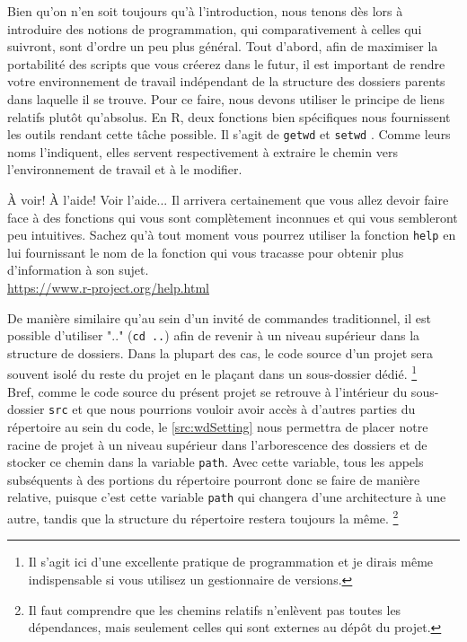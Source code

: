 Bien qu'on n'en soit toujours qu'à l'introduction, nous tenons dès lors à introduire des notions de programmation, qui comparativement à celles qui suivront, sont d'ordre un peu plus général. Tout d'abord, afin de maximiser la portabilité des scripts que vous créerez dans le futur, il est important de rendre votre environnement de travail indépendant de la structure des dossiers parents dans laquelle il se trouve. Pour ce faire, nous devons utiliser le principe de liens relatifs plutôt qu'absolus. En R, deux fonctions bien spécifiques nous fournissent les outils rendant cette tâche possible. Il s'agit de \texttt{getwd} et \texttt{setwd} \cite{Rfunction:setwd}. Comme leurs noms l'indiquent, elles servent respectivement à extraire le chemin vers l'environnement de travail et à le modifier. \\

\begin{moreInfo}{À voir! À l'aide! Voir l'aide...}
	Il arrivera certainement que vous allez devoir faire face à des fonctions qui vous sont complètement inconnues et qui vous sembleront peu intuitives. Sachez qu'à tout moment vous pourrez utiliser la fonction \texttt{help} en lui fournissant le nom de la fonction qui vous tracasse pour obtenir plus d'information à son sujet. \\
	\url{https://www.r-project.org/help.html}
\end{moreInfo}

De manière similaire qu'au sein d'un invité de commandes traditionnel, il est possible d'utiliser ".." (\texttt{cd ..}) afin de revenir à un niveau supérieur dans la structure de dossiers. Dans la plupart des cas, le code source d'un projet sera souvent isolé du reste du projet en le plaçant dans un sous-dossier dédié. \footnote{Il s'agit ici d'une excellente pratique de programmation et je dirais même indispensable si vous utilisez un gestionnaire de versions.} \\

Bref, comme le code source du présent projet se retrouve à l'intérieur du sous-dossier \texttt{src} \cite{repo:RAQ} et que nous pourrions vouloir avoir accès à d'autres parties du répertoire au sein du code, le \autoref{src:wdSetting} nous permettra de placer notre racine de projet à un niveau supérieur dans l'arborescence des dossiers et de stocker ce chemin dans la variable \texttt{path}. Avec cette variable, tous les appels subséquents à des portions du répertoire pourront donc se faire de manière relative, puisque c'est cette variable \texttt{path} qui changera d'une architecture à une autre, tandis que la structure du répertoire restera toujours la même. \footnote{Il faut comprendre que les chemins relatifs n'enlèvent pas toutes les dépendances, mais seulement celles qui sont externes au dépôt du projet.} \\


